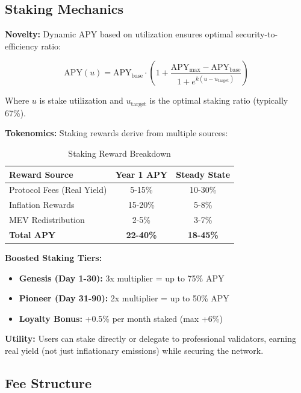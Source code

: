 \documentclass[12pt,a4paper]{article}
\begin{document}
\subsection{Staking Mechanics}

\textbf{Novelty:} Dynamic APY based on utilization ensures optimal security-to-efficiency ratio:

\begin{equation}
\text{APY}(u) = \text{APY}_{\text{base}} \cdot \left(1 + \frac{\text{APY}_{\text{max}} - \text{APY}_{\text{base}}}{1 + e^{k(u - u_{\text{target}})}}\right)
\end{equation}

Where $u$ is stake utilization and $u_{\text{target}}$ is the optimal staking ratio (typically 67\%).

\textbf{Tokenomics:} Staking rewards derive from multiple sources:

\begin{table}[h]
\centering
\begin{tabular}{lcc}
\toprule
\textbf{Reward Source} & \textbf{Year 1 APY} & \textbf{Steady State} \\
\midrule
Protocol Fees (Real Yield) & 5-15\% & 10-30\% \\
Inflation Rewards & 15-20\% & 5-8\% \\
MEV Redistribution & 2-5\% & 3-7\% \\
\midrule
\textbf{Total APY} & \textbf{22-40\%} & \textbf{18-45\%} \\
\bottomrule
\end{tabular}
\caption{Staking Reward Breakdown}
\end{table}

\textbf{Boosted Staking Tiers:}
\begin{itemize}
    \item \textbf{Genesis (Day 1-30):} 3x multiplier = up to 75\% APY
    \item \textbf{Pioneer (Day 31-90):} 2x multiplier = up to 50\% APY
    \item \textbf{Loyalty Bonus:} +0.5\% per month staked (max +6\%)
\end{itemize}

\textbf{Utility:} Users can stake directly or delegate to professional validators, earning real yield (not just inflationary emissions) while securing the network.

\subsection{Fee Structure}
\end{document}
